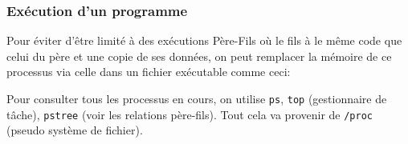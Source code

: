 \subsubsection{Exécution d'un
programme}\label{exuxe9cution-dun-programme}

Pour éviter d'être limité à des exécutions Père-Fils où le fils à le
même code que celui du père et une copie de ses données, on peut
remplacer la mémoire de ce processus via celle dans un fichier
exécutable comme ceci:

\begin{Shaded}
\begin{Highlighting}[]
\PreprocessorTok{ }

\OperatorTok{(}  \OperatorTok{*}\OperatorTok{,}  \OperatorTok{*}\OperatorTok{[],}  \OperatorTok{*}\OperatorTok{[]);}
\end{Highlighting}
\end{Shaded}

Pour consulter tous les processus en cours, on utilise \texttt{ps},
\texttt{top} (gestionnaire de tâche), \texttt{pstree} (voir les
relations père-fils). Tout cela va provenir de \texttt{/proc} (pseudo
système de fichier).
